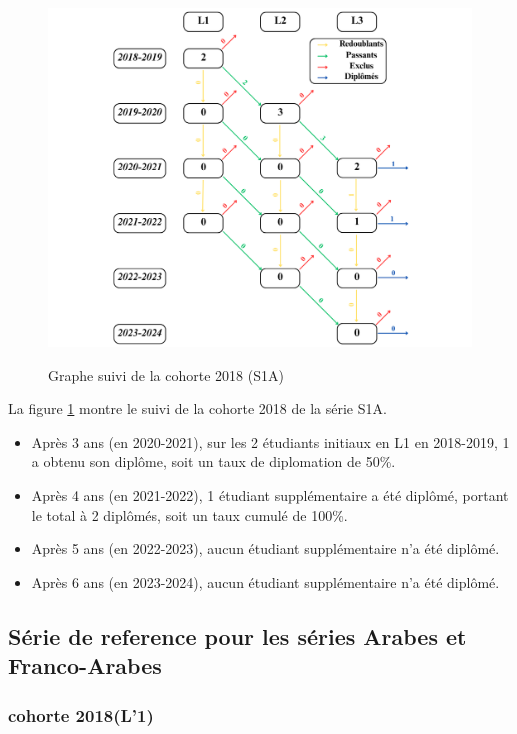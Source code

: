 \begin{figure}[ht]
    \centering
    \caption{Graphe suivi de la cohorte 2018 (S1A)}
    \includegraphics[width=1\textwidth]{figure/S1A_2018.png}
    \label{fig:cohorte_s1a_2018}
\end{figure}

La figure \ref{fig:cohorte_s1a_2018} montre le suivi de la cohorte 2018 de la série S1A.
\begin{itemize}
    \item Après 3 ans (en 2020-2021), sur les 2 étudiants initiaux en L1 en 2018-2019, 1 a obtenu son diplôme, soit un taux de diplomation de 50\%.
    \item Après 4 ans (en 2021-2022), 1 étudiant supplémentaire a été diplômé, portant le total à 2 diplômés, soit un taux cumulé de 100\%.
    \item Après 5 ans (en 2022-2023), aucun étudiant supplémentaire n'a été diplômé.
    \item Après 6 ans (en 2023-2024), aucun étudiant supplémentaire n'a été diplômé.
\end{itemize}

\newpage
\subsection{Série de reference pour les séries Arabes et Franco-Arabes}

\subsubsection{cohorte 2018(L'1)}

